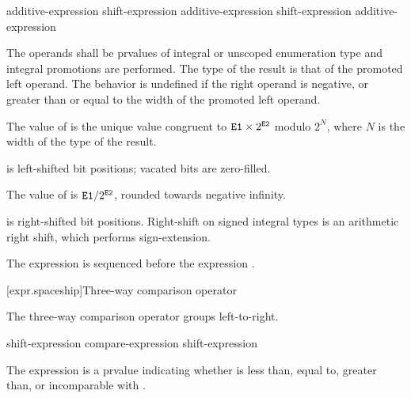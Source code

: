 %
%
%
%
%
\begin{bnf}
\br
    additive-expression\br
    shift-expression \terminal{<<} additive-expression\br
    shift-expression \terminal{>>} additive-expression
\end{bnf}

The operands shall be prvalues of integral or unscoped enumeration type and integral
promotions are performed. The type of the result is that of the promoted
left operand.
%
The behavior is undefined if the right operand is negative, or greater
than or equal to the width of the promoted left operand.

\pnum
The value of  is the unique value congruent to
$\tcode{E1} \times 2^\tcode{E2}$ modulo $2^N$,
where $N$ is the width of the type of the result.
\begin{note}
 is left-shifted  bit positions;
vacated bits are zero-filled.
\end{note}

\pnum
The value of  is $\tcode{E1} / 2^\tcode{E2}$,
rounded towards negative infinity.
\begin{note}
 is right-shifted  bit positions.
Right-shift on signed integral types is an arithmetic right shift,
which performs sign-extension.
\end{note}

\pnum
The expression  is sequenced before the expression .

[expr.spaceship]{Three-way comparison operator}
%
%

\pnum
The three-way comparison operator groups left-to-right.

%
%
%

\begin{bnf}
\br
    shift-expression\br
    compare-expression \terminal{<=>} shift-expression
\end{bnf}

\pnum
The expression  is a prvalue indicating whether
 is less than, equal to, greater than, or incomparable with
.

